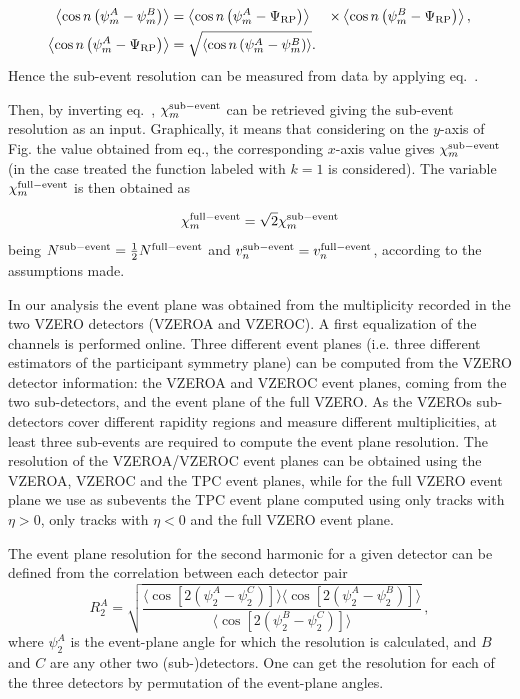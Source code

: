 \begin{eqnarray}
 \left\langle \cos n\left( \psi_m^A-\psi_m^B\right)\right\rangle &= \left\langle \cos n\left( \psi_m^A-\Psi_{\rm RP}\right)\right\rangle &\times  \left\langle \cos n\left( \psi_m^B-\Psi_{\rm RP}\right)\right\rangle, \label{f:epreso2}\\
\left\langle \cos n\left( \psi_m^A-\Psi_{\rm RP}\right)\right\rangle &= \sqrt{\left\langle \cos n\left( \psi_m^A-\psi_m^B\right)\right\rangle}. & \label{f:epreso3} 
\end{eqnarray}
Hence the sub-event resolution can be measured from data by applying eq.~.

Then, by inverting eq.~, $\chi_m^{\rm sub-event}$ can be retrieved giving the sub-event resolution as an input. Graphically, it means that considering on the $y$-axis of Fig. the value obtained from eq.,  the corresponding $x$-axis value gives $\chi_m^{\rm sub-event}$ (in the case treated the function labeled with $k=1$ is considered). The variable $\chi_m^{\rm full-event}$ is then obtained as

\begin{equation}
 \chi_m^{\rm full-event}=\sqrt{2}\chi_m^{\rm sub-event}
\end{equation}
being $N^{\rm sub-event}=\frac{1}{2}N^{\rm full-event}$ and ${v}_n^{\rm sub-event}={v}_n^{\rm full-event}$, according to the assumptions made. 


In our analysis the event plane was obtained from the multiplicity recorded in the two VZERO detectors (VZEROA and VZEROC). A first equalization of the channels is performed online. Three different event planes (i.e. three different estimators 
of the participant symmetry plane) can be computed from the VZERO detector information: the VZEROA and VZEROC event planes, coming from the two sub-detectors, and the event plane of the full VZERO. 
As the VZEROs sub-detectors cover different rapidity regions and measure different multiplicities, at least three sub-events are required to compute the event plane resolution. The resolution of the VZEROA/VZEROC event planes can be obtained using the VZEROA, VZEROC and the TPC event planes, while for the full VZERO event plane we use as subevents the TPC event plane computed using only tracks with $\eta>0$, only tracks with $\eta<0$ and the full VZERO event plane. 

The event plane resolution for the second harmonic for a given detector can be defined from the correlation between each detector pair
\begin{equation}
R_2^A=\sqrt{\frac{\langle\cos [2(\psi_2^A-\psi_2^C)] \rangle \langle\cos [2(\psi_2^A-\psi_2^B)] \rangle}{\langle\cos [2(\psi_2^B-\psi_2^C)] \rangle}}\,,
\end{equation}
where $\psi_2^A$ is the event-plane angle for which the resolution is calculated, and $B$ and $C$ are any other two (sub-)detectors. One can get the resolution for each of the three detectors by permutation of the event-plane angles. 
